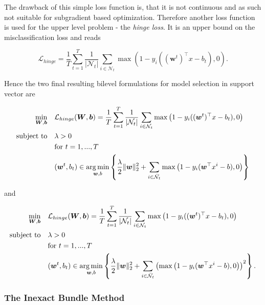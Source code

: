The drawback of this simple loss function is, that it is not continuous and as such not suitable for subgradient based optimization. Therefore another loss function is used for the upper level problem - the \emph{hinge loss}. It is an upper bound on the misclassification loss and reads

\begin{equation}
		\mathcal{L}_{hinge} = \frac{1}{T}\sum_{t=1}^T\frac{1}{|\mathcal{N}_t|}\sum_{i \in \mathcal{N}_t}{\max\left(1-y_i((\bm{w}^t)^{\top}x-b_t),0\right)}.
\label{hinge_loss}
\end{equation}

Hence the two final resulting bilevel formulations for model selection in support vector are 

\begin{align}
\begin{split}
	\min_{\bm{W},\bm{b}} \quad &  \mathcal{L}_{hinge}(\bm{W},\bm{b}) = \frac{1}{T}\sum_{t=1}^T\frac{1}{|\mathcal{N}_t|}\sum_{i \in \mathcal{N}_t}{\max\left(1-y_i((\bm{w}^t)^{\top}x-b_t),0\right)}\\
	\text{subject to} \quad &  \lambda > 0 \\
	& \text{for } t = 1,...,T \\
	& (\bm{w}^t,b_t) \in \operatorname*{arg\,min}_{\bm{w},b}\left\{ \frac{\lambda}{2} \|\bm{w}\|^2_2+\sum_{i\in \bar{\mathcal{N}}_t}{\max\left(1-y_i(\bm{w}^{\top}x^i-b),0\right)}\right\} \\
\end{split}
\label{model_1}
\end{align}

and 

\begin{align}
\begin{split}
	\min_{\bm{W},\bm{b}} \quad &  \mathcal{L}_{hinge}(\bm{W},\bm{b}) = \frac{1}{T}\sum_{t=1}^T\frac{1}{|\mathcal{N}_t|}\sum_{i \in \mathcal{N}_t}{\max\left(1-y_i((\bm{w}^t)^{\top}x-b_t),0\right)}\\
	\text{subject to} \quad & \lambda > 0 \\
	& \text{for } t = 1,...,T \\
	& (\bm{w}^t,b_t) \in \operatorname*{arg\,min}_{\bm{w},b}\left\{ \frac{\lambda}{2} \|\bm{w}\|^2_2+\sum_{i\in \bar{\mathcal{N}}_t}{\left(\max\left(1-y_i(\bm{w}^{\top}x^i-b),0\right)\right)^2}\right\}. \\
\end{split}
\label{model_2}
\end{align}


\subsubsection{The Inexact Bundle Method}

